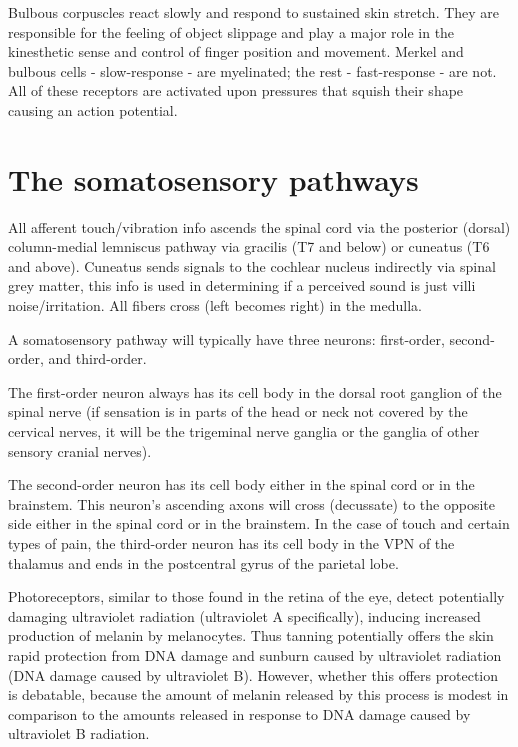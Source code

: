 Bulbous corpuscles react slowly and respond to sustained skin stretch. They are responsible for the feeling of object slippage and play a major role in the kinesthetic sense and control of finger position and movement. Merkel and bulbous cells - slow-response - are myelinated; the rest - fast-response - are not. All of these receptors are activated upon pressures that squish their shape causing an action potential.

\hypertarget{the-somatosensory-pathways}{%
\section{The somatosensory pathways}\label{the-somatosensory-pathways}}

All afferent touch/vibration info ascends the spinal cord via the posterior (dorsal) column-medial lemniscus pathway via gracilis (T7 and below) or cuneatus (T6 and above). Cuneatus sends signals to the cochlear nucleus indirectly via spinal grey matter, this info is used in determining if a perceived sound is just villi noise/irritation. All fibers cross (left becomes right) in the medulla.

A somatosensory pathway will typically have three neurons: first-order, second-order, and third-order.

The first-order neuron always has its cell body in the dorsal root ganglion of the spinal nerve (if sensation is in parts of the head or neck not covered by the cervical nerves, it will be the trigeminal nerve ganglia or the ganglia of other sensory cranial nerves).

The second-order neuron has its cell body either in the spinal cord or in the brainstem. This neuron's ascending axons will cross (decussate) to the opposite side either in the spinal cord or in the brainstem.
In the case of touch and certain types of pain, the third-order neuron has its cell body in the VPN of the thalamus and ends in the postcentral gyrus of the parietal lobe.

Photoreceptors, similar to those found in the retina of the eye, detect potentially damaging ultraviolet radiation (ultraviolet A specifically), inducing increased production of melanin by melanocytes. Thus tanning potentially offers the skin rapid protection from DNA damage and sunburn caused by ultraviolet radiation (DNA damage caused by ultraviolet B). However, whether this offers protection is debatable, because the amount of melanin released by this process is modest in comparison to the amounts released in response to DNA damage caused by ultraviolet B radiation.

